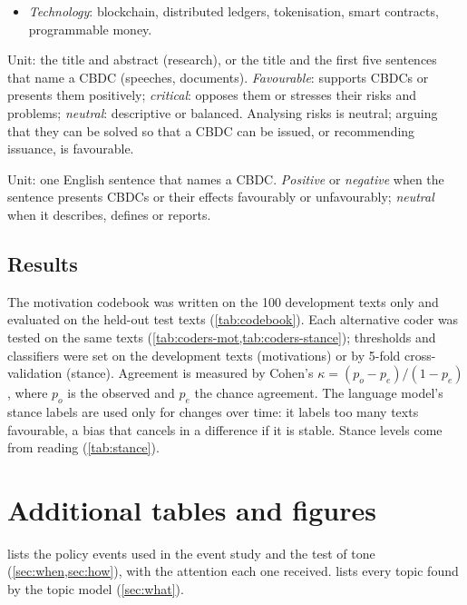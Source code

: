 \documentclass[11pt,a4paper]{article}
\begin{document}
\begin{description}
\begin{itemize}
\item \emph{Technology}: blockchain, distributed ledgers, tokenisation, smart contracts, programmable money.
\end{itemize}
\item[Stance.] Unit: the title and abstract (research), or the title and the first five sentences that name a CBDC (speeches, documents). \emph{Favourable}: supports CBDCs or presents them positively; \emph{critical}: opposes them or stresses their risks and problems; \emph{neutral}: descriptive or balanced. Analysing risks is neutral; arguing that they can be solved so that a CBDC can be issued, or recommending issuance, is favourable.
\item[Tone.] Unit: one English sentence that names a CBDC. \emph{Positive} or \emph{negative} when the sentence presents CBDCs or their effects favourably or unfavourably; \emph{neutral} when it describes, defines or reports.
\end{description}

\subsection{Results}
The motivation codebook was written on the 100 development texts only and evaluated on the held-out test texts (\cref{tab:codebook}). Each alternative coder was tested on the same texts (\cref{tab:coders-mot,tab:coders-stance}); thresholds and classifiers were set on the development texts (motivations) or by 5-fold cross-validation (stance). Agreement is measured by Cohen's $\kappa = (p_o - p_e)/(1 - p_e)$, where $p_o$ is the observed and $p_e$ the chance agreement. The language model's stance labels are used only for changes over time: it labels too many texts favourable, a bias that cancels in a difference if it is stable. Stance levels come from reading (\cref{tab:stance}).







\section{Additional tables and figures}\label{app:additional}

 lists the policy events used in the event study and the test of tone (\cref{sec:when,sec:how}), with the attention each one received.  lists every topic found by the topic model (\cref{sec:what}).
\end{document}
